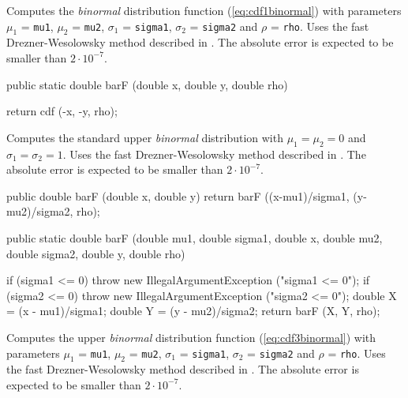 \begin{tabb} Computes the {\em binormal\/} distribution function 
   (\ref{eq:cdf1binormal}) with parameters $\mu_1$ = \texttt{mu1},
 $\mu_2$ = \texttt{mu2}, $\sigma_1$ = \texttt{sigma1},  $\sigma_2$ =
   \texttt{sigma2} and $\rho$ = \texttt{rho}.
   Uses the fast Drezner-Wesolowsky method described in \cite{tDRE90a}. 
   The absolute error is expected to be smaller  than $2 \cdot 10^{-7}$.  
\end{tabb}
\begin{code}

   public static double barF (double x, double y, double rho) \begin{hide} {
      return cdf (-x, -y, rho);
    }\end{hide}
\end{code}
 \begin{tabb} Computes the standard upper {\em binormal\/} distribution 
   with $\mu_1 = \mu_2 = 0$ and $\sigma_1 = \sigma_2 = 1$.
   Uses the fast Drezner-Wesolowsky method described in \cite{tDRE90a}. 
   The absolute error is expected to be smaller  than $2 \cdot 10^{-7}$.  
 \end{tabb}
\begin{code}\begin{hide}

   public double barF (double x, double y) {
      return barF ((x-mu1)/sigma1, (y-mu2)/sigma2, rho);
   }\end{hide}

   public static double barF (double mu1, double sigma1, double x, 
                              double mu2, double sigma2, double y,
                              double rho) \begin{hide} {
      if (sigma1 <= 0)
         throw new IllegalArgumentException ("sigma1 <= 0");
      if (sigma2 <= 0)
         throw new IllegalArgumentException ("sigma2 <= 0");
      double X = (x - mu1)/sigma1;
      double Y = (y - mu2)/sigma2;
      return barF (X, Y, rho);
   }\end{hide}
\end{code}
\begin{tabb} Computes the upper {\em binormal\/} distribution function
    (\ref{eq:cdf3binormal})  with parameters $\mu_1$ = \texttt{mu1},
   $\mu_2$ = \texttt{mu2}, $\sigma_1$ = \texttt{sigma1},  $\sigma_2$ =
  \texttt{sigma2} and $\rho$ = \texttt{rho}.
   Uses the fast Drezner-Wesolowsky method described in \cite{tDRE90a}. 
   The absolute error is expected to be smaller  than $2 \cdot 10^{-7}$.  
\end{tabb}
